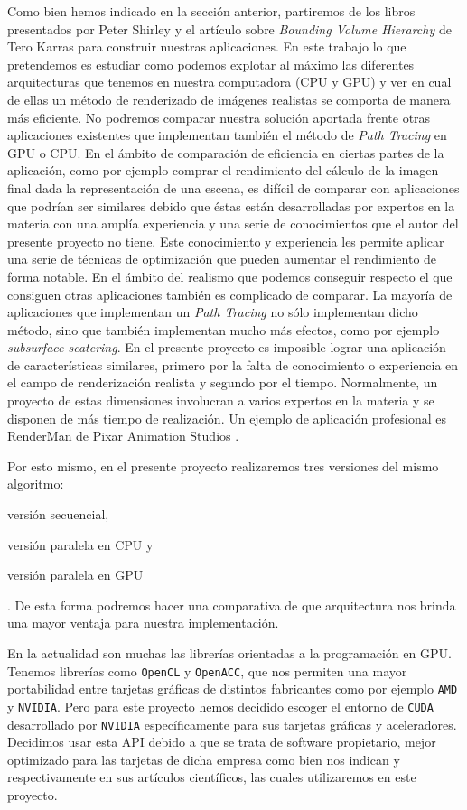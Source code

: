 \documentclass[titlepage,12pt]{article}
\begin{document}
Como bien hemos indicado en la sección anterior, partiremos de los libros presentados por Peter Shirley y el artículo sobre \textit{Bounding Volume Hierarchy} de Tero Karras para construir nuestras aplicaciones. En este trabajo lo que pretendemos es estudiar como podemos explotar al máximo las diferentes arquitecturas que tenemos en nuestra computadora (CPU y GPU) y ver en cual de ellas un método de renderizado de imágenes realistas se comporta de manera más eficiente. No podremos comparar nuestra solución aportada frente otras aplicaciones existentes que implementan también el método de \textit{Path Tracing} en GPU o CPU. En el ámbito de comparación de eficiencia en ciertas partes de la aplicación, como por ejemplo comprar el rendimiento del cálculo de la imagen final dada la representación de una escena, es difícil de comparar con aplicaciones que podrían ser similares debido que éstas están desarrolladas por expertos en la materia con una amplía experiencia y una serie de conocimientos que el autor del presente proyecto no tiene. Este conocimiento y experiencia les permite aplicar una serie de técnicas de optimización que pueden aumentar el rendimiento de forma notable. En el ámbito del realismo que podemos conseguir respecto el que consiguen otras aplicaciones también es complicado de comparar. La mayoría de aplicaciones que implementan un \textit{Path Tracing} no sólo implementan dicho método, sino que también implementan mucho más efectos, como por ejemplo \textit{subsurface scatering}. En el presente proyecto es imposible lograr una aplicación de características similares, primero por la falta de conocimiento o experiencia en el campo de renderización realista y segundo por el tiempo. Normalmente, un proyecto de estas dimensiones involucran a varios expertos en la materia y se disponen de más tiempo de realización. Un ejemplo de aplicación profesional es RenderMan de Pixar Animation Studios \citep{Christensen2018}.

Por esto mismo, en el presente proyecto realizaremos tres versiones del mismo algoritmo: \begin{enumerate*}[label=\roman*)] \item versión secuencial, \item versión paralela en CPU y \item versión paralela en GPU \end{enumerate*}. De esta forma podremos hacer una comparativa de que arquitectura nos brinda una mayor ventaja para nuestra implementación.

En la actualidad son muchas las librerías orientadas a la programación en GPU. Tenemos librerías como \texttt{OpenCL} y \texttt{OpenACC}, que nos permiten una mayor portabilidad entre tarjetas gráficas de distintos fabricantes como por ejemplo \texttt{AMD} y \texttt{NVIDIA}. Pero para este proyecto hemos decidido escoger el entorno de \texttt{CUDA} desarrollado por \texttt{NVIDIA} específicamente para sus tarjetas gráficas y aceleradores. Decidimos usar esta API debido a que se trata de software propietario, mejor optimizado para las tarjetas de dicha empresa como bien nos indican \citep{Karimi2010} y \citep{Fang2011} respectivamente en sus artículos científicos, las cuales utilizaremos en este proyecto.
\end{document}
